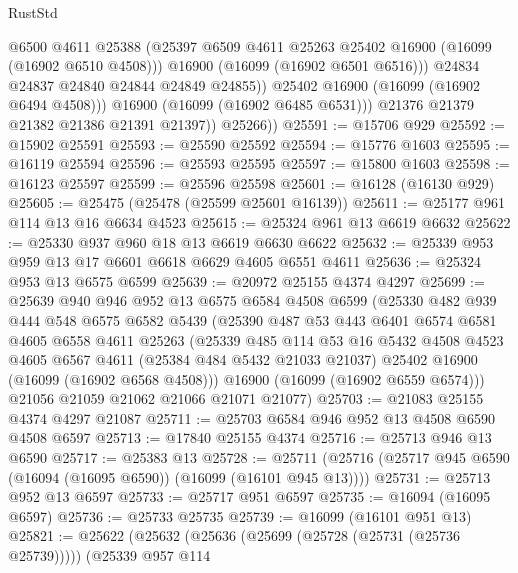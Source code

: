 \begin{lexlean}{RustStd}
\begin{coremodule}
                      @6500
                      @4611
                      @25388
                      (@25397 @6509 @4611 @25263 @25402 @16900 (@16099 (@16902 @6510 @4508)))
                      @16900
                      (@16099 (@16902 @6501 @6516)))
                    @24834
                    @24837
                    @24840
                    @24844
                    @24849
                    @24855))
                @25402
                @16900
                (@16099 (@16902 @6494 @4508)))
              @16900
              (@16099 (@16902 @6485 @6531)))
            @21376
            @21379
            @21382
            @21386
            @21391
            @21397))
        @25266))
@25591 := @15706 @929
@25592 := @15902 @25591
@25593 := @25590 @25592
@25594 := @15776 @1603
@25595 := @16119 @25594
@25596 := @25593 @25595
@25597 := @15800 @1603
@25598 := @16123 @25597
@25599 := @25596 @25598
@25601 := @16128 (@16130 @929)
@25605 := @25475 (@25478 (@25599 @25601 @16139))
@25611 := @25177 @961 @114 @13 @16 @6634 @4523
@25615 := @25324 @961 @13 @6619 @6632
@25622 := @25330 @937 @960 @18 @13 @6619 @6630 @6622
@25632 := @25339 @953 @959 @13 @17 @6601 @6618 @6629 @4605 @6551 @4611
@25636 := @25324 @953 @13 @6575 @6599
@25639 := @20972 @25155 @4374 @4297
@25699 := @25639
    @940
    @946
    @952
    @13
    @6575
    @6584
    @4508
    @6599
    (@25330
      @482
      @939
      @444
      @548
      @6575
      @6582
      @5439
      (@25390
        @487
        @53
        @443
        @6401
        @6574
        @6581
        @4605
        @6558
        @4611
        @25263
        (@25339
          @485
          @114
          @53
          @16
          @5432
          @4508
          @4523
          @4605
          @6567
          @4611
          (@25384 @484 @5432 @21033 @21037)
          @25402
          @16900
          (@16099 (@16902 @6568 @4508)))
        @16900
        (@16099 (@16902 @6559 @6574)))
      @21056
      @21059
      @21062
      @21066
      @21071
      @21077)
@25703 := @21083 @25155 @4374 @4297 @21087
@25711 := @25703 @6584 @946 @952 @13 @4508 @6590 @4508 @6597
@25713 := @17840 @25155 @4374
@25716 := @25713 @946 @13 @6590
@25717 := @25383 @13
@25728 := @25711 (@25716 (@25717 @945 @6590 (@16094 (@16095 @6590)) (@16099 (@16101 @945 @13))))
@25731 := @25713 @952 @13 @6597
@25733 := @25717 @951 @6597
@25735 := @16094 (@16095 @6597)
@25736 := @25733 @25735
@25739 := @16099 (@16101 @951 @13)
@25821 := @25622
    (@25632
      (@25636 (@25699 (@25728 (@25731 (@25736 @25739)))))
      (@25339
        @957
        @114

\end{coremodule}
\end{lexlean}
